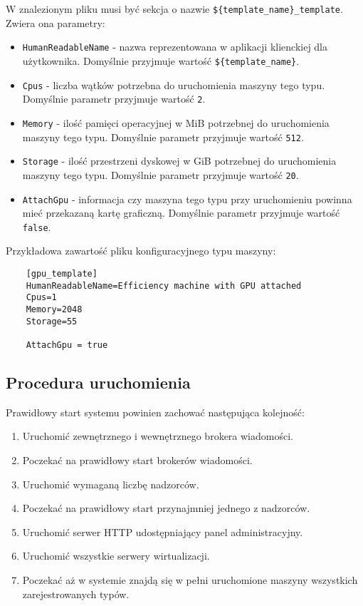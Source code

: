 \documentclass[../opis-rozwiazania.tex]{subfiles}
\begin{document}
W znalezionym pliku musi być sekcja o nazwie \texttt{\$\{template\_name\}\_template}.
Zwiera ona parametry:
\begin{itemize}
  \item \texttt{HumanReadableName} - nazwa reprezentowana w aplikacji klienckiej dla użytkownika. Domyślnie przyjmuje wartość \texttt{\$\{template\_name\}}.
  \item \texttt{Cpus} - liczba wątków potrzebna do uruchomienia maszyny tego typu. Domyślnie parametr przyjmuje wartość \texttt{2}.
  \item \texttt{Memory} - ilość pamięci operacyjnej w MiB potrzebnej do uruchomienia maszyny tego typu. Domyślnie parametr przyjmuje wartość \texttt{512}.
  \item \texttt{Storage} - ilość przestrzeni dyskowej w GiB potrzebnej do uruchomienia maszyny tego typu. Domyślnie parametr przyjmuje wartość \texttt{20}.
  \item \texttt{AttachGpu} - informacja czy maszyna tego typu przy uruchomieniu powinna mieć przekazaną kartę graficzną. Domyślnie parametr przyjmuje wartość \texttt{false}.
\end{itemize}

Przykładowa zawartość pliku konfiguracyjnego typu maszyny:

\begin{verbatim}
	[gpu_template]
	HumanReadableName=Efficiency machine with GPU attached
	Cpus=1
	Memory=2048
	Storage=55

	AttachGpu = true
\end{verbatim}

\subsection{Procedura uruchomienia}
\label{system_startup.procedure}
Prawidłowy start systemu powinien zachować następująca kolejność:
\begin{enumerate}
  \item Uruchomić zewnętrznego i wewnętrznego brokera wiadomości.
  \item Poczekać na prawidłowy start brokerów wiadomości.
  \item Uruchomić wymaganą liczbę nadzorców.
  \item Poczekać na prawidłowy start przynajmniej jednego z nadzorców.
  \item Uruchomić serwer HTTP udostępniający panel administracyjny.
  \item Uruchomić wszystkie serwery wirtualizacji.
  \item Poczekać aż w systemie znajdą się w pełni uruchomione maszyny wszystkich zarejestrowanych typów.
\end{enumerate}
\end{document}

